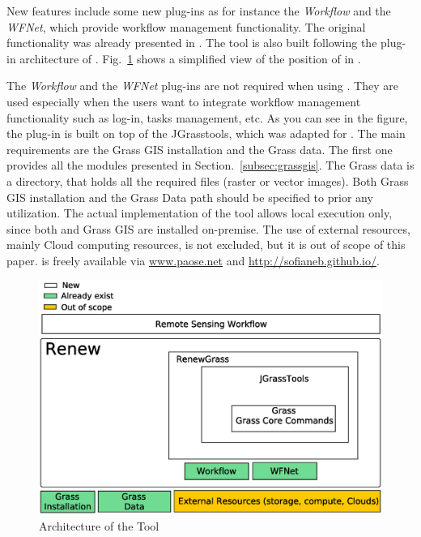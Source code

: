 %
New features include some new plug-ins as for instance the \emph{Workflow} and the \emph{WFNet}, which provide workflow management functionality.
%
The original functionality was already presented in \cite{Jacob+02a}.
%
The \RenewGrass{} tool is also built following the plug-in architecture of \Renew{}.
%
Fig.~\ref{fig:renewgrass} shows a simplified view of the position of \RenewGrass{} in \Renew{}.
%

The \emph{Workflow} and the \emph{WFNet} plug-ins are not required when using \RenewGrass{}. 
%
They are used especially when the users want to integrate workflow management functionality such as log-in, tasks management, etc. 
%
As you can see in the figure, the \RenewGrass{} plug-in is built on top of the JGrasstools, which was adapted for \Renew{}.
%
The main requirements are the Grass GIS installation and the Grass data. 
%
The first one provides all the modules presented in Section.~\ref{subsec:grassgis}. 
%
The Grass data is a directory, that holds all the required files (raster or vector images).
%
Both Grass GIS installation and the Grass Data path should be specified to \RenewGrass{} prior any utilization.
%
The actual implementation of the tool allows local execution only, since both \Renew{} and Grass GIS are installed on-premise. 
%
The use of external resources, mainly Cloud computing resources, is not excluded, but it is out of scope of this paper.
%
\RenewGrass{} is freely available via \url{www.paose.net} and \url{http://sofianeb.github.io/}.
%


\begin{figure}[!t]
\centering
\includegraphics[width=\textwidth]{ArchitectureGrassRenew2}
\caption{Architecture of the \RenewGrass{} Tool}
\label{fig:renewgrass}
\end{figure}



